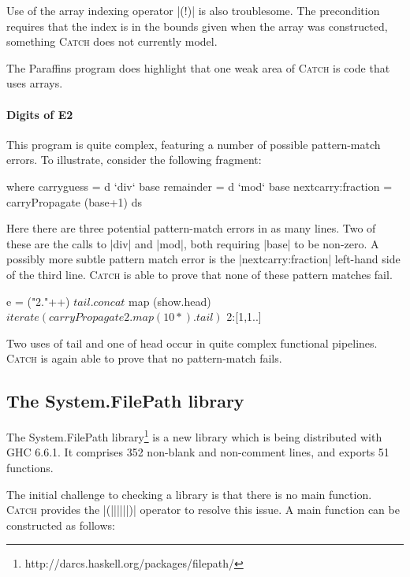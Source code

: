 \documentclass[preprint]{sigplanconf}
\newcommand{\C}[1]{\textsf{#1}}
\newcommand{\catch}{\textsc{Catch}}
\begin{document}
Use of the array indexing operator |(!)| is also troublesome. The precondition requires that the index is in the bounds given when the array was constructed, something \catch{} does not currently model.

The Paraffins program does highlight that one weak area of \catch{} is code that uses arrays.

\paragraph{Digits of E2}

This program is quite complex, featuring a number of possible pattern-match errors. To illustrate, consider the following fragment:

\begin{code}
  where  carryguess = d `div` base
         remainder = d `mod` base
         nextcarry:fraction = carryPropagate (base+1) ds
\end{code}

\noindent Here there are three potential pattern-match errors in as many lines. Two of these are the calls to |div| and |mod|, both requiring |base| to be non-zero. A possibly more subtle pattern match error is the |nextcarry:fraction| left-hand side of the third line. \catch{} is able to prove that none of these pattern matches fail.

\begin{code}
e =  ("2."++) $
     tail . concat $
     map (show.head) $
     iterate (carryPropagate 2 . map (10*) . tail) $
     2:[1,1..]
\end{code}

\noindent Two uses of \C{tail} and one of \C{head} occur in quite complex functional pipelines. \catch{} is again able to prove that no pattern-match fails.

\subsection{The System.FilePath library}
\label{sec:filepath}

The System.FilePath library\footnote{http://darcs.haskell.org/packages/filepath/} is a new library which is being distributed with GHC 6.6.1. It comprises 352 non-blank and non-comment lines, and exports 51 functions.

The initial challenge to checking a library is that there is no \C{main} function. \catch{} provides the |(||||||)| operator to resolve this issue. A \C{main} function can be constructed as follows:
\end{document}

